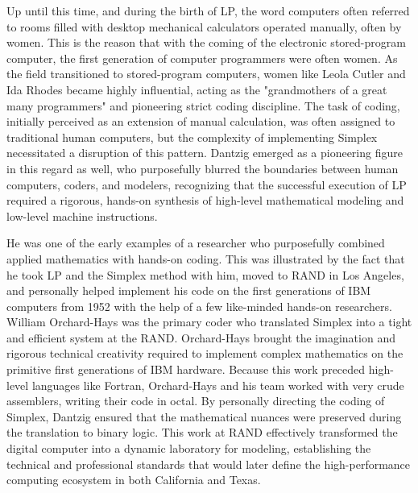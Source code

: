 Up until this time, and during the birth of LP, the word computers often referred to rooms filled with desktop mechanical calculators operated manually, often by women. This is the reason that with the coming of the electronic stored-program computer, the first generation of computer programmers were often women. As the field transitioned to stored-program computers, women like Leola Cutler and Ida Rhodes became highly influential, acting as the "grandmothers of a great many programmers" and pioneering strict coding discipline. The task of coding, initially perceived as an extension of manual calculation, was often assigned to traditional human computers, but the complexity of implementing Simplex necessitated a disruption of this pattern. Dantzig emerged as a pioneering figure in this regard as well, who purposefully blurred the boundaries between human computers, coders, and modelers, recognizing that the successful execution of LP required a rigorous, hands-on synthesis of high-level mathematical modeling and low-level machine instructions.  

He was one of the early examples of a researcher who purposefully combined applied mathematics with hands-on coding. This was illustrated by the fact that he took LP and the Simplex method with him, moved to RAND in Los Angeles, and personally helped implement his code on the first generations of IBM computers from 1952 with the help of a few like-minded hands-on researchers. William Orchard-Hays was the primary coder who translated Simplex into a tight and efficient system at the RAND. Orchard-Hays brought the imagination and rigorous technical creativity required to implement complex mathematics on the primitive first generations of IBM hardware. Because this work preceded high-level languages like Fortran, Orchard-Hays and his team worked with very crude assemblers, writing their code in octal. By personally directing the coding of Simplex, Dantzig ensured that the mathematical nuances were preserved during the translation to binary logic. This work at RAND effectively transformed the digital computer into a dynamic laboratory for modeling, establishing the technical and professional standards that would later define the high-performance computing ecosystem in both California and Texas. 

